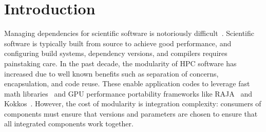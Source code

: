 \section{Introduction}
\label{sec:intro}




Managing dependencies for scientific software is notoriously
difficult~\cite{hoste+:pyhpc12,gamblin+:sc15,dubois2003johnny,hochstein+:2011-build}.
Scientific software is typically built from source to achieve good performance, and
configuring build systems, dependency versions, and compilers requires painstaking care.
In the past decade, the modularity of HPC software has increased due to well known
benefits such as separation of concerns, encapsulation, and code reuse. These enable
application codes to leverage fast math libraries~\cite{hypre,mfem,petsc,trilinos} and
GPU performance portability frameworks like RAJA~\cite{raja} and Kokkos~\cite{kokkos}.
However, the cost of modularity is integration complexity: consumers of components must
ensure that versions and parameters are chosen to ensure that all integrated components
work together.

